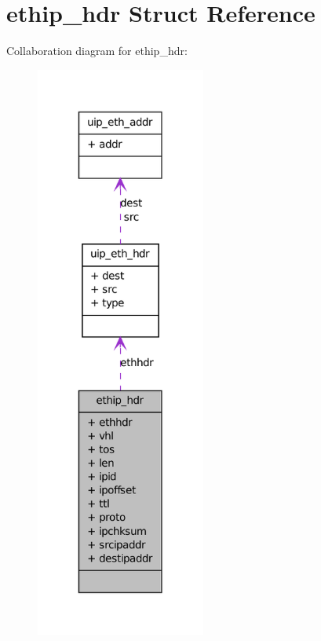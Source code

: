 \hypertarget{structethip__hdr}{
\section{ethip\_\-hdr Struct Reference}
\label{structethip__hdr}
}


Collaboration diagram for ethip\_\-hdr:
\nopagebreak
\begin{figure}[H]
\begin{center}
\leavevmode
\includegraphics[width=158pt]{structethip__hdr__coll__graph}
\end{center}
\end{figure}
